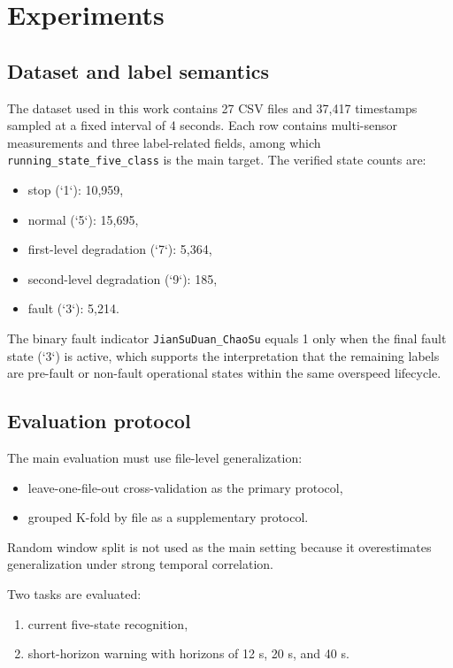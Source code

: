 \section{Experiments}
\label{sec:experiments}

\subsection{Dataset and label semantics}

The dataset used in this work contains 27 CSV files and 37,417 timestamps sampled at a fixed interval of 4 seconds. Each row contains multi-sensor measurements and three label-related fields, among which \texttt{running\_state\_five\_class} is the main target. The verified state counts are:
\begin{itemize}
\item stop (`1`): 10,959,
\item normal (`5`): 15,695,
\item first-level degradation (`7`): 5,364,
\item second-level degradation (`9`): 185,
\item fault (`3`): 5,214.
\end{itemize}

The binary fault indicator \texttt{JianSuDuan\_ChaoSu} equals 1 only when the final fault state (`3`) is active, which supports the interpretation that the remaining labels are pre-fault or non-fault operational states within the same overspeed lifecycle.

\subsection{Evaluation protocol}

The main evaluation must use file-level generalization:
\begin{itemize}
\item leave-one-file-out cross-validation as the primary protocol,
\item grouped K-fold by file as a supplementary protocol.
\end{itemize}

Random window split is not used as the main setting because it overestimates generalization under strong temporal correlation.

Two tasks are evaluated:
\begin{enumerate}
\item current five-state recognition,
\item short-horizon warning with horizons of 12 s, 20 s, and 40 s.
\end{enumerate}

